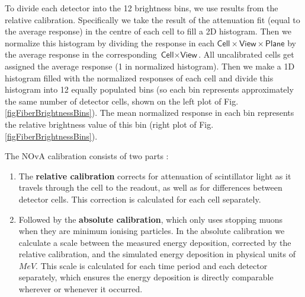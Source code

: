 To divide each detector into the 12 brightness bins, we use results from the relative calibration. Specifically we take the result of the attenuation fit (equal to the average response) in the centre of each cell to fill a 2D histogram. Then we normalize this histogram by dividing the response in each $\textsf{Cell}\times\textsf{View}\times\textsf{Plane}$ by the average response in the corresponding $\textsf{Cell}\times\textsf{View}$. All uncalibrated cells get assigned the average response (1 in normalized histogram). Then we make a 1D histogram filled with the normalized responses of each cell and divide this histogram into 12 equally populated bins (so each bin represents approximately the same number of detector cells, shown on the left plot of Fig. \ref{figFiberBrightnessBins}). The mean normalized response in each bin represents the relative brightness value of this bin (right plot of Fig. \ref{figFiberBrightnessBins}).




The NOvA calibration consists of two parts \cite{NOVA-doc-7410}:
\begin{enumerate}
\item The \textbf{relative calibration} corrects for attenuation of scintillator light as it travels through the cell to the readout, as well as for differences between detector cells. This correction is calculated for each cell separately.
\item Followed by the \textbf{absolute calibration}, which only uses stopping muons when they are minimum ionising particles. In the absolute calibration we calculate a scale between the measured energy deposition, corrected by the relative calibration, and the simulated energy deposition in physical units of $\unit{MeV}$. This scale is calculated for each time period and each detector separately, which ensures the energy deposition is directly comparable wherever or whenever it occurred.
\end{enumerate}


